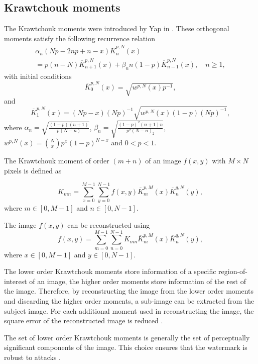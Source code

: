 \documentclass[runningheads]{llncs}
\begin{document}
\subsection*{Krawtchouk moments}
The Krawtchouk moments were introduced by Yap in \cite{Yap2003}. These orthogonal moments satisfy the following recurrence relation
\begin{multline*}
\alpha_n(Np-2np+n-x)\overline{K}_{n}^{p,N}(x) \\= p(n-N)\overline{K}_{n+1}^{p,N}(x)+\beta_n n(1-p)\overline{K}_{n-1}^{p,N}(x),\quad n\geq 1,
\end{multline*}
with initial conditions 
\begin{equation*}
\overline{K}_{0}^{p,N}(x) = \sqrt{w^{p,N}(x)p^{-1}},
\end{equation*}	
and
\begin{equation*}
\overline{K}_{1}^{p,N}(x) = (Np-x)(Np)^{-1}\sqrt{w^{p,N}(x)(1-p)(Np)^{-1}},
\end{equation*}
where $\alpha_n = \sqrt{\frac{(1-p)(n+1)}{p(N-n)}}$, $\beta_n = \sqrt{\frac{(1-p)^2(n+1)n}{p^2(N-n)_2}}$, $w^{p,N}(x) = \binom{N}{x}p^x(1-p)^{N-x}$ and $0<p<1$.

The Krawtchouk moment of order $(m+n)$ of an image $f(x,y)$ with $M\times N$ pixels is defined as

\begin{equation}
K_{mn}=\sum_{x=0}^{M-1}\sum_{y=0}^{N-1}f(x,y)\overline{K}_{m}^{p,M}(x)\overline{K}_{n}^{q,N}(y),
\label{DKT}
\end{equation}
where $m\in \left[ 0,M-1\right] $ and $n\in \left[ 0,N-1\right] $.

The image $f(x,y)$ can be reconstructed using
\begin{equation}
f(x,y)=\sum_{m=0}^{M-1}\sum_{n=0}^{N-1}K_{mn}\overline{K}_{m}^{p,M}(x)\overline{K}_{n}^{q,N}(y),
\label{IDKT}
\end{equation}
where $x\in \left[ 0,M-1\right] $ and $y\in \left[ 0,N-1\right] $.

The lower order Krawtchouk moments store information of a specific region-of-interest of an image, the higher order moments store information of the rest of the image. Therefore, by reconstructing the image from the lower order moments and discarding the higher order moments, a sub-image can be extracted from the subject image. For each additional moment used in reconstructing the image, the square error of the reconstructed image is reduced \cite{Yap2003}.

	The set of lower order Krawtchouk moments is generally the set of perceptually significant components of the image. This choice ensures that the watermark is robust to attacks \cite{Yap2004}.
\end{document}
